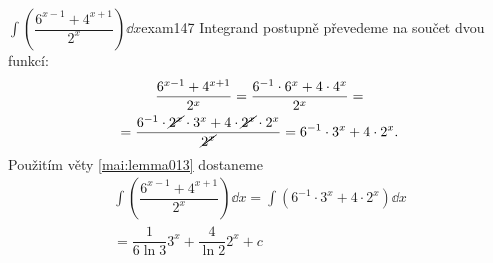 \begin{mathexam}{\(\int\left(\dfrac{6^{x-1} + 4^{x+1}}{2^x}\right)\dd{x}\)}{exam147} 
  Integrand postupně převedeme na součet dvou funkcí:
  \begin{multline*}
    \dfrac{6^{x-1} + 4^{x+1}}{2^x} = \dfrac{6^{-1}\cdot6^x + 4\cdot4^x}{2^x} =   \\
      = \dfrac{6^{-1}\cdot\cancel{2^x}\cdot3^x + 4\cdot\cancel{2^x}\cdot2^x}{\cancel{2^x}} 
      = 6^{-1}\cdot3^x + 4\cdot2^x. 
  \end{multline*}
  Použitím věty \ref{mai:lemma013} dostaneme
  \begin{multline*}
    \int\left(\dfrac{6^{x-1}+4^{x+1}}{2^x}\right)\dd{x} = \int(6^{-1}\cdot3^x + 4\cdot2^x)\dd{x} \\
      = \dfrac{1}{6\ln3}3^x + \dfrac{4}{\ln2}2^x + c
  \end{multline*}
\end{mathexam}